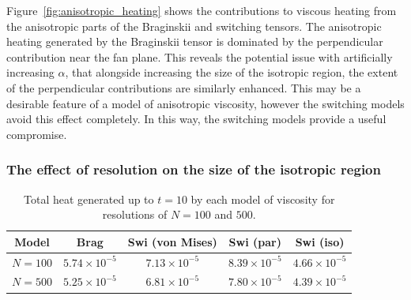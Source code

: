 Figure~\ref{fig:anisotropic_heating} shows the contributions to viscous heating from the anisotropic parts of the Braginskii and switching tensors. The anisotropic heating generated by the Braginskii tensor is dominated by the perpendicular contribution near the fan plane. This reveals the potential issue with artificially increasing $\alpha$, that alongside increasing the size of the isotropic region, the extent of the perpendicular contributions are similarly enhanced. This may be a desirable feature of a model of anisotropic viscosity, however the switching models avoid this effect completely. In this way, the switching models provide a useful compromise.

\subsubsection{The effect of resolution on the size of the isotropic region}

\begin{table}[t]
  \centering
  \caption{Total heat generated up to $t=10$ by each model of viscosity for resolutions of $N=100$ and $500$.}
  \label{tab:slow_null_results_resolution}
  \begin{tabular}{c|cccc}
Model &  Brag & Swi (von Mises) & Swi (par) & Swi (iso)\\
\midrule
$N=100$ &  $5.74 \times 10^{-5}$ & $7.13 \times 10^{-5}$ & $8.39 \times 10^{-5}$ & $4.66 \times 10^{-5}$\\
$N=500$   & $5.25 \times 10^{-5}$ & $6.81 \times 10^{-5}$ & $7.80 \times 10^{-5}$ & $4.39 \times 10^{-5}$  \end{tabular}
\end{table}

